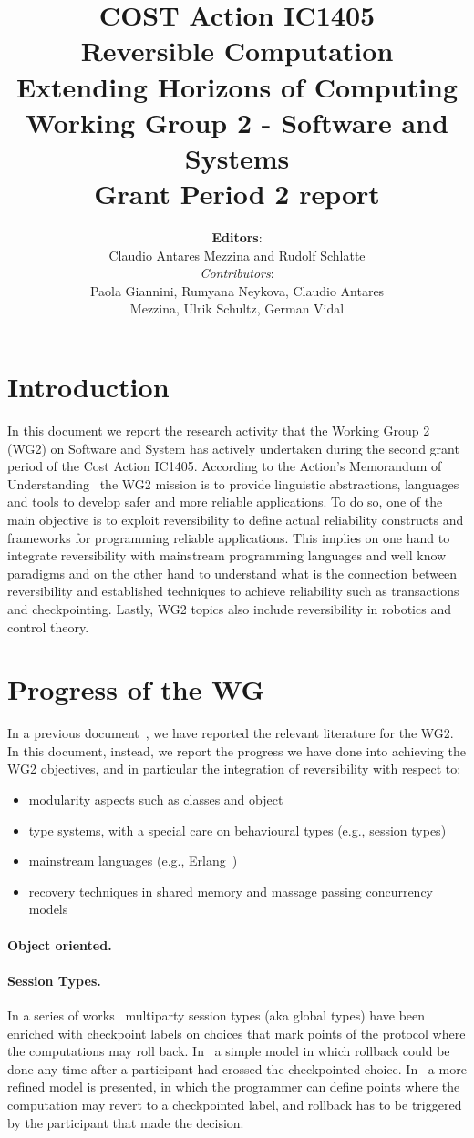 \documentclass[a4paper,oneside]{article}
\title{COST Action IC1405\\Reversible Computation \\ Extending Horizons of Computing \\[3ex]
 Working Group 2 - Software and Systems \\[3ex] Grant Period 2 report }
\author{\textbf{Editors}:\\ %
Claudio Antares Mezzina and Rudolf Schlatte
\\[3ex]
\textit{Contributors}:\\ %
Paola Giannini,
Rumyana Neykova,
Claudio Antares \\Mezzina,
Ulrik Schultz,
German Vidal
}
\begin{document}

\clearpage

\section{Introduction}
In this document we report the research activity that the Working Group 2 (WG2) on Software and System has actively undertaken during the second grant period of the Cost Action IC1405. According to the Action's Memorandum of Understanding~\cite{mou}  the WG2 mission is to provide linguistic abstractions, languages and tools to develop safer and more reliable applications. To do so, one of the main objective is to exploit reversibility to define actual reliability constructs and frameworks for programming reliable applications. This implies on one hand to integrate reversibility with mainstream programming languages and well know paradigms and on the other hand to understand what is the connection between reversibility and established techniques to achieve reliability such as
 transactions and checkpointing. Lastly, WG2 topics also include reversibility in robotics and control theory.



\section{Progress of the WG}
In a previous document~\cite{wg2report}, we have reported  the relevant literature for the WG2. In this document, instead, we report   the progress we have done into achieving the WG2 objectives, and in particular the integration of reversibility with respect to:

\begin{itemize}
	\item modularity aspects such as classes and object
	\item type systems, with a special care on behavioural types (e.g., session types)
	\item mainstream languages (e.g., Erlang~\cite{AVW96})
	\item recovery techniques in shared memory and massage passing concurrency models
\end{itemize}

\paragraph{Object oriented.}
  

\paragraph{Session Types.}
In a series of works~\cite{DG16,CDG17}
multiparty session types (aka global types) have been enriched with checkpoint labels on choices that mark points of the protocol where the computations may roll back. In~\cite{DG16}  a simple model in which rollback could be done any time after a participant had crossed the checkpointed choice. In~\cite{CDG17}
 a more refined model is presented, in which  the programmer can define  points where  the computation may revert to a checkpointed label, and rollback has to be triggered by the participant that made the decision. 
 
\end{document}
